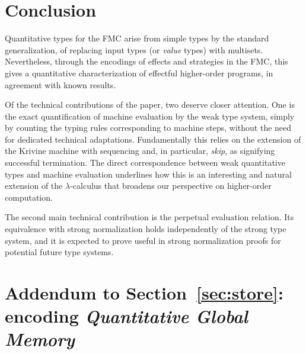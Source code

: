 \documentclass[a4paper,UKenglish,cleveref, autoref, thm-restate]{lipics-v2021}
\begin{document}
\section{Conclusion}

Quantitative types for the FMC arise from simple types by the standard generalization, of replacing input types (or \emph{value} types) with multisets. Nevertheless, through the encodings of effects and strategies in the FMC, this gives a quantitative characterization of effectful higher-order programs, in agreement with known results.

Of the technical contributions of the paper, two deserve closer attention. One is the exact quantification of machine evaluation by the weak type system, simply by counting the typing rules corresponding to machine steps, without the need for dedicated technical adaptations. Fundamentally this relies on the extension of the Krivine machine with sequencing and, in particular, \emph{skip}, as signifying successful termination. The direct correspondence between weak quantitative types and machine evaluation underlines how this is an interesting and natural extension of the $\lambda$-calculus that broadens our perspective on higher-order computation.

The second main technical contribution is the perpetual evaluation relation. Its equivalence with strong normalization holds independently of the strong type system, and it is expected to prove useful in strong normalization proofs for potential future type systems.








\newpage
\appendix



\newcommand\aaa{\mathrm{a}}
\newcommand\vvv{\mathrm{v}}
\newcommand\ttt{\mathrm{tt}}
\newcommand\nnn{\mathrm{n}}

\newcommand\MMM{\mathcal M}
\newcommand\NNN{\mathcal N}
\newcommand\SSS{\mathcal S}

\section{Addendum to Section~\ref{sec:store}: encoding \emph{Quantitative Global Memory}}
\label{sec:QGM}
\end{document}
